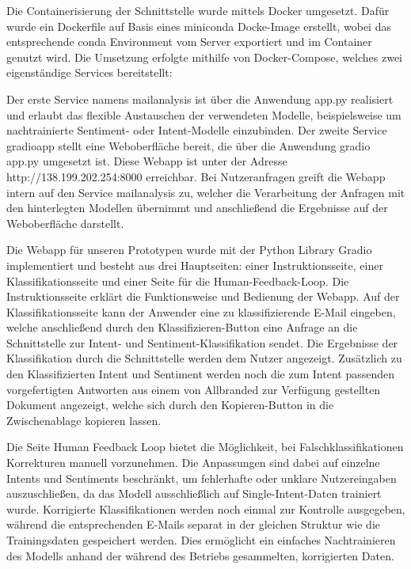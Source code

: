 Die Containerisierung der Schnittstelle wurde mittels Docker umgesetzt. Dafür wurde ein
Dockerfile auf Basis eines miniconda Docke-Image erstellt, wobei das entsprechende conda
Environment vom Server exportiert und im Container genutzt wird. Die Umsetzung erfolgte mithilfe
von Docker-Compose, welches zwei eigenständige Services bereitstellt: 

Der erste Service namens mailanalysis ist über die Anwendung app.py realisiert und erlaubt
das flexible Austauschen der verwendeten Modelle, beispielsweise um nachtrainierte Sentiment-
oder Intent-Modelle einzubinden. Der zweite Service gradioapp stellt eine Weboberfläche bereit,
die über die Anwendung gradio app.py umgesetzt ist. Diese Webapp ist unter der
Adresse http://138.199.202.254:8000 erreichbar. Bei Nutzeranfragen greift die Webapp intern
auf den Service mailanalysis zu, welcher die Verarbeitung der Anfragen mit den hinterlegten
Modellen übernimmt und anschließend die Ergebnisse auf der Weboberfläche darstellt. 

Die Webapp für unseren Prototypen wurde mit der Python Library Gradio implementiert und besteht
aus drei Hauptseiten: einer Instruktionsseite, einer Klassifikationsseite und einer Seite für
die Human-Feedback-Loop. Die Instruktionsseite erklärt die Funktionsweise und Bedienung
der Webapp. Auf der Klassifikationsseite kann der Anwender eine zu klassifizierende E-Mail
eingeben, welche anschließend durch den Klassifizieren-Button eine Anfrage an die Schnittstelle
zur Intent- und Sentiment-Klassifikation sendet. Die Ergebnisse der Klassifikation durch die
Schnittstelle werden dem Nutzer angezeigt. Zusätzlich zu den Klassifizierten Intent und Sentiment
werden noch die zum Intent passenden vorgefertigten Antworten aus einem von Allbranded zur
Verfügung gestellten Dokument angezeigt, welche sich durch den Kopieren-Button in die
Zwischenablage kopieren lassen.  

Die Seite Human Feedback Loop bietet die Möglichkeit, bei Falschklassifikationen Korrekturen
manuell vorzunehmen. Die Anpassungen sind dabei auf einzelne Intents und Sentiments beschränkt,
um fehlerhafte oder unklare Nutzereingaben auszuschließen, da das Modell ausschließlich auf
Single-Intent-Daten trainiert wurde. Korrigierte Klassifikationen werden noch einmal zur
Kontrolle ausgegeben, während die entsprechenden E-Mails separat in der gleichen Struktur
wie die Trainingsdaten gespeichert werden. Dies ermöglicht ein einfaches Nachtrainieren des
Modells anhand der während des Betriebs gesammelten, korrigierten Daten. 

